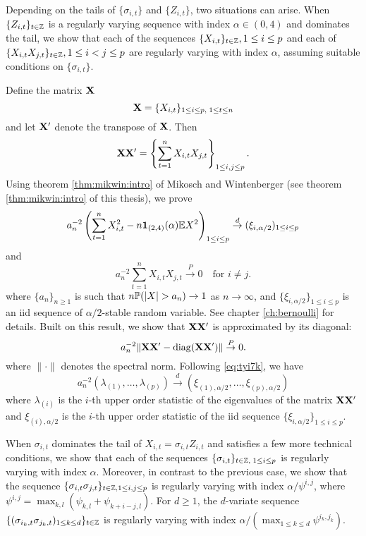 Depending on the tails of $\{\sigma_{i,t}\}$ and $\{Z_{i,t}\}$,
two situations can arise. When $\{Z_{i,t}\}_{t \in \integers}$
is a regularly varying sequence with index $\alpha \in (0, 4)$
and dominates the tail, we show that each of the sequences
$\{X_{i,t}\}_{t \in \integers}, 1 \leq i \leq p$ and each of
$\{X_{i,t} X_{j,t}\}_{t \in \integers}, 1\leq i < j \leq p$
are regularly varying with index $\alpha$, assuming suitable
conditions on $\{\sigma_{i,t}\}$.

Define the matrix $\mtx X$
\[
\mtx X = \{X_{i,t}\}_{1 \leq i \leq p,\;1 \leq t \leq n}
\]
and let $\mtx X'$ denote the transpose of $\mtx X$. Then
\[
\mtx{XX'} =
\left\{\sum_{t=1}^n X_{i,t} X_{j,t}\right\}_{1 \leq i,j \leq p}.
\]
Using theorem \ref{thm:mikwin:intro} of Mikosch and Wintenberger
\cite{mikosch:wintenberger:2016}
(see theorem \ref{thm:mikwin:intro} of this thesis), we prove 
\[
a_n^{-2} \left(
\sum_{t=1}^n X_{i,t}^2 - n \I_{(2,4)}(\alpha) \E X^2
\right)_{1 \leq i \leq p}
\overset{d}{\to}
(\xi_{i, \alpha/2})_{1 \leq i \leq p}
\]
and
\[
a_n^{-2} \sum_{t=1}^n X_{i,t} X_{j,t} \overset{P}{\to} 0
\quad
\text{for } i \neq j.
\]
where $\{a_n\}_{n\geq 1}$ is such that $n\P(|X| > a_n) \to 1$
as $n \to \infty$,
and $\{\xi_{i, \alpha/2}\}_{1 \leq i \leq p}$ is an iid sequence of
$\alpha/2$-stable random variable.
See chapter \ref{ch:bernoulli} for details.
Built on this result, we show that $\mtx{XX'}$
is approximated by its diagonal:
\begin{equation}
  \label{eq:tyi7k}
  a_n^{-2} \|\mtx{X X'} - \diag(\mtx{X X'}) \|
  \overset{P}{\to} 0.
\end{equation}
where $\|\cdot\|$ denotes the spectral norm. Following
\eqref{eq:tyi7k}, we have
\[
a_n^{-2} (\lambda_{(1)}, \ldots, \lambda_{(p)})
\overset{d}{\to}
(\xi_{(1), \alpha/2}, \dots, \xi_{(p), \alpha/2})
\]
where $\lambda_{(i)}$ is the $i$-th upper order statistic of the
eigenvalues of the matrix $\mtx{XX'}$ and $\xi_{(i), \alpha/2}$ is
the $i$-th upper order statistic of the iid sequence
$\{\xi_{i, \alpha/2}\}_{1 \leq i \leq p}$.

When $\sigma_{i,t}$ dominates the tail of $X_{i,t} = \sigma_{i,t} Z_{i,t}$
and satisfies a few more
technical conditions, we show that each of the sequences
$\{\sigma_{i,t}\}_{t \in \integers,\; 1 \leq i \leq p}$
is regularly varying with index $\alpha$. Moreover, in contrast to the
previous case, we show that the sequence
$\{\sigma_{i,t} \sigma_{j,t}\}_{t \in \integers, 1 \leq i,j \leq p}$
is regularly varying with index $\alpha/\psi^{i,j}$, where
$\psi^{i,j} = \max_{k,l}(\psi_{k,l} + \psi_{k+i-j, l})$.
For $d \geq 1$, the $d$-variate sequence
$\{(\sigma_{i_k, t} \sigma_{j_k, t})_{1 \leq k \leq d}\}_{t \in \integers}$
is regularly varying with index
$\alpha /(\max_{1 \leq k \leq d} \psi^{i_k, j_k})$.

